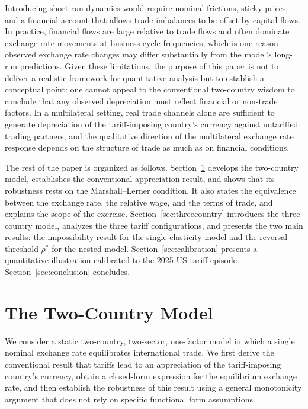 \documentclass[11pt]{article}
\theoremstyle{plain}
\theoremstyle{remark}
\numberwithin{lemma}{section}
\numberwithin{proposition}{section}
\numberwithin{corollary}{section}
\newcommand{\rev}[1]{{\color{RevBlue}#1}}
\begin{document}
Introducing short-run dynamics would require nominal frictions, sticky prices, and a financial account that allows trade imbalances to be offset by capital flows. In practice, financial flows are large relative to trade flows and often dominate exchange rate movements at business cycle frequencies, which is one reason observed exchange rate changes may differ substantially from the model's long-run predictions. Given these limitations, the purpose of this paper is not to deliver a realistic framework for quantitative analysis but to establish a conceptual point: one cannot appeal to the conventional two-country wisdom to conclude that any observed depreciation must reflect financial or non-trade factors. In a multilateral setting, real trade channels alone are sufficient to generate depreciation of the tariff-imposing country's currency against untariffed trading partners, and the qualitative direction of the multilateral exchange rate response depends on the structure of trade as much as on financial conditions.

\rev{The rest of the paper is organized as follows. Section~\ref{sec:twocountry} develops the two-country model, establishes the conventional appreciation result, and shows that its robustness rests on the Marshall--Lerner condition. It also states the equivalence between the exchange rate, the relative wage, and the terms of trade, and explains the scope of the exercise. Section~\ref{sec:threecountry} introduces the three-country model, analyzes the three tariff configurations, and presents the two main results: the impossibility result for the single-elasticity model and the reversal threshold $\rho^*$ for the nested model. Section~\ref{sec:calibration} presents a quantitative illustration calibrated to the 2025 US tariff episode. Section~\ref{sec:conclusion} concludes.}

\section{The Two-Country Model}
\label{sec:twocountry}

We consider a static two-country, two-sector, one-factor model in which a single nominal exchange rate equilibrates international trade. We first derive the conventional result that tariffs lead to an appreciation of the tariff-imposing country's currency, obtain a closed-form expression for the equilibrium exchange rate, and then establish the robustness of this result using a general monotonicity argument that does not rely on specific functional form assumptions.
\end{document}
